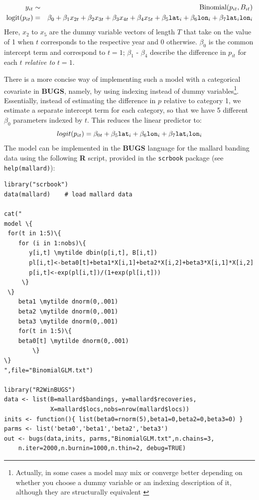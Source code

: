 {{\begin{eqnarray*}
y_{it} &\sim & \mbox{Binomial}(p_{it}, B_{it}) \\
\mbox{logit}(p_{it}) &=& \beta_0 + \beta_1 x_{2t}+ \beta_2 x_{3t} +
\beta_3 x_{4t} + \beta_4 x_{5t} + 
\beta_5 \mbox{\tt lat}_i + \beta_6 \mbox{\tt lon}_i + \beta_7
\mbox{\tt lat}_i \mbox{\tt lon}_i
\end{eqnarray*}
Here, $x_{2}$ to $x_{5}$ are the dummy variable vectors of length $T$ that take on the value of 1 when $t$ corresponds to the respective year and 0 otherwise. $\beta_0$ is the common intercept term and correspond to $t=1$; $\beta_1$ - $\beta_4$ describe the difference in $p_{it}$ for each $t$ \emph{relative to} $t=1$.

There is a more concise way of implementing such a model with a
categorical covariate in {\bf BUGS}, namely, by using indexing instead
of dummy variables\footnote{Actually, in some cases a model may mix or
  converge better depending on whether you choose a dummy variable or
  an indexing description of it, although they are structurally
  equivalent \citep{kery:2010}}. Essentially, instead of estimating
the difference in $p$ relative to category 1, we estimate a separate
intercept term for each category, so that we have 5 different $\beta_0$
parameters indexed by $t$. This reduces the linear predictor to:
\[
logit(p_{it}) = \beta_{0t} +  \beta_5 \mbox{\tt lat}_i + \beta_6
\mbox{\tt lon}_i + \beta_7 \mbox{\tt lat}_i \mbox{\tt lon}_i
\]
The model can be implemented in the {\bf BUGS} language for the
mallard banding data using the following {\bf R} script, provided in
the \mbox{\tt scrbook} package (see \mbox{\tt help(mallard)}): 
{\small
\begin{Verbatim}[commandchars=\\\{\}] 
library("scrbook")
data(mallard)    # load mallard data

cat("
model \{
 for(t in 1:5)\{
    for (i in 1:nobs)\{
       y[i,t] \mytilde dbin(p[i,t], B[i,t])
       pl[i,t]<-beta0[t]+beta1*X[i,1]+beta2*X[i,2]+beta3*X[i,1]*X[i,2]
       p[i,t]<-exp(pl[i,t])/(1+exp(pl[i,t]))
     \}
 \}
	beta1 \mytilde dnorm(0,.001)
	beta2 \mytilde dnorm(0,.001)
	beta3 \mytilde dnorm(0,.001)
	for(t in 1:5)\{
 	beta0[t] \mytilde dnorm(0,.001)  
        \}
\}
",file="BinomialGLM.txt")

library("R2WinBUGS")
data <- list(B=mallard$bandings, y=mallard$recoveries,
             X=mallard$locs,nobs=nrow(mallard$locs))
inits <- function(){ list(beta0=rnorm(5),beta1=0,beta2=0,beta3=0) }
parms <- list('beta0','beta1','beta2','beta3')
out <- bugs(data,inits, parms,"BinomialGLM.txt",n.chains=3,
 	n.iter=2000,n.burnin=1000,n.thin=2, debug=TRUE)
\end{Verbatim}


}}}
